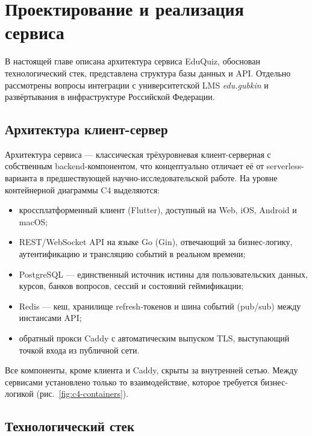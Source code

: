 \section{Проектирование и реализация сервиса}
\thispagestyle{plain}

В настоящей главе описана архитектура сервиса EduQuiz, обоснован
технологический стек, представлена структура базы данных
и API. Отдельно рассмотрены вопросы интеграции с университетской
LMS \textit{edu.gubkin} и развёртывания в инфраструктуре Российской
Федерации.

\subsection{Архитектура клиент-сервер}

Архитектура сервиса --- классическая трёхуровневая клиент-серверная
с собственным backend-компонентом, что концептуально отличает её
от serverless-варианта в предшествующей научно-исследовательской
работе. На уровне контейнерной диаграммы C4 выделяются:
\begin{itemize}[noitemsep]
    \item кроссплатформенный клиент (Flutter), доступный на Web,
          iOS, Android и macOS;
    \item REST/WebSocket API на языке Go (Gin), отвечающий за
          бизнес-логику, аутентификацию и трансляцию событий
          в реальном времени;
    \item PostgreSQL --- единственный источник истины
          для пользовательских данных, курсов, банков вопросов,
          сессий и состояний геймификации;
    \item Redis --- кеш, хранилище refresh-токенов и шина
          событий (pub/sub) между инстансами API;
    \item обратный прокси Caddy с автоматическим выпуском TLS,
          выступающий точкой входа из публичной сети.
\end{itemize}

Все компоненты, кроме клиента и Caddy, скрыты за внутренней сетью.
Между сервисами установлено только то взаимодействие, которое
требуется бизнес-логикой (рис.~\ref{fig:c4-containers}).


\subsection{Технологический стек}

